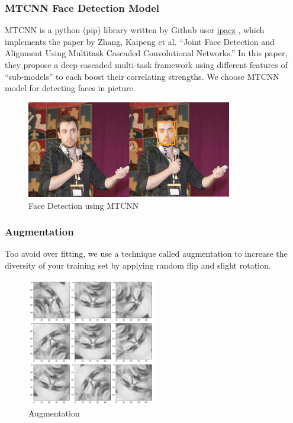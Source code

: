 \documentclass[11pt,a4paper]{article}
\begin{document}
    \subsubsection{MTCNN Face Detection Model}
    MTCNN is a python (pip) library written by Github user \href{https://github.com/ipazc/mtcnn}{ipacz} \cite{MTCNN}, which implements the paper by Zhang, Kaipeng et al. “Joint Face Detection and Alignment Using Multitask Cascaded Convolutional Networks.” \cite{1604.02878} In this paper, they propose a deep cascaded multi-task framework using different features of “sub-models” to each boost their correlating strengths. We choose MTCNN model for detecting faces in picture.
    \begin{figure}[H]
        \centering
        \includegraphics[width = 0.8\textwidth]{written_report/pictures/mtcnn.jpg}
        \caption{Face Detection using MTCNN}
        \label{fig:MTCNN}
    \end{figure}
    
    \subsubsection{Augmentation}
    Too avoid over fitting, we use a technique called augmentation to increase the diversity of your training set by applying random flip and slight rotation.
    \begin{figure}[H]
        \centering
        \includegraphics[width = 0.5\textwidth]{emotion_detection/plot/augmentation.pdf}
        \caption{Augmentation}
        \label{fig:augmentation}
    \end{figure}
    
\end{document}
